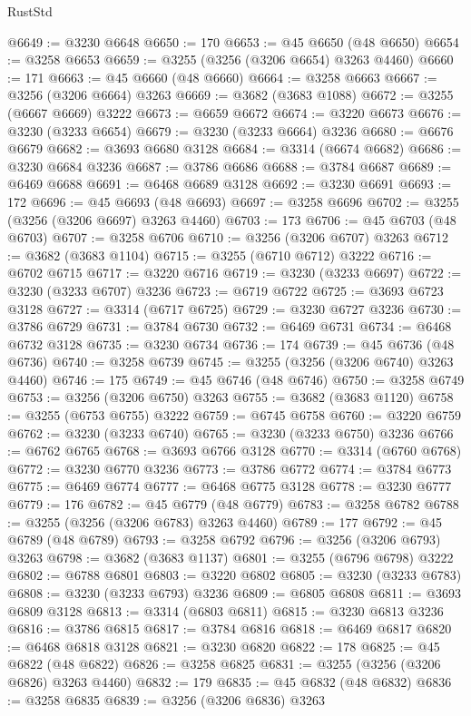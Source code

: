 \begin{lexlean}{RustStd}
\begin{coremodule}
{\begin{coremodule}
{{{{{{{{{{{{{{{{{{{{{{{{{{{{{{{{{{{{{@6649 := @3230 @6648
@6650 := 170
@6653 := @45 @6650 (@48 @6650)
@6654 := @3258 @6653
@6659 := @3255 (@3256 (@3206 @6654) @3263 @4460)
@6660 := 171
@6663 := @45 @6660 (@48 @6660)
@6664 := @3258 @6663
@6667 := @3256 (@3206 @6664) @3263
@6669 := @3682 (@3683 @1088)
@6672 := @3255 (@6667 @6669) @3222
@6673 := @6659 @6672
@6674 := @3220 @6673
@6676 := @3230 (@3233 @6654)
@6679 := @3230 (@3233 @6664) @3236
@6680 := @6676 @6679
@6682 := @3693 @6680 @3128
@6684 := @3314 (@6674 @6682)
@6686 := @3230 @6684 @3236
@6687 := @3786 @6686
@6688 := @3784 @6687
@6689 := @6469 @6688
@6691 := @6468 @6689 @3128
@6692 := @3230 @6691
@6693 := 172
@6696 := @45 @6693 (@48 @6693)
@6697 := @3258 @6696
@6702 := @3255 (@3256 (@3206 @6697) @3263 @4460)
@6703 := 173
@6706 := @45 @6703 (@48 @6703)
@6707 := @3258 @6706
@6710 := @3256 (@3206 @6707) @3263
@6712 := @3682 (@3683 @1104)
@6715 := @3255 (@6710 @6712) @3222
@6716 := @6702 @6715
@6717 := @3220 @6716
@6719 := @3230 (@3233 @6697)
@6722 := @3230 (@3233 @6707) @3236
@6723 := @6719 @6722
@6725 := @3693 @6723 @3128
@6727 := @3314 (@6717 @6725)
@6729 := @3230 @6727 @3236
@6730 := @3786 @6729
@6731 := @3784 @6730
@6732 := @6469 @6731
@6734 := @6468 @6732 @3128
@6735 := @3230 @6734
@6736 := 174
@6739 := @45 @6736 (@48 @6736)
@6740 := @3258 @6739
@6745 := @3255 (@3256 (@3206 @6740) @3263 @4460)
@6746 := 175
@6749 := @45 @6746 (@48 @6746)
@6750 := @3258 @6749
@6753 := @3256 (@3206 @6750) @3263
@6755 := @3682 (@3683 @1120)
@6758 := @3255 (@6753 @6755) @3222
@6759 := @6745 @6758
@6760 := @3220 @6759
@6762 := @3230 (@3233 @6740)
@6765 := @3230 (@3233 @6750) @3236
@6766 := @6762 @6765
@6768 := @3693 @6766 @3128
@6770 := @3314 (@6760 @6768)
@6772 := @3230 @6770 @3236
@6773 := @3786 @6772
@6774 := @3784 @6773
@6775 := @6469 @6774
@6777 := @6468 @6775 @3128
@6778 := @3230 @6777
@6779 := 176
@6782 := @45 @6779 (@48 @6779)
@6783 := @3258 @6782
@6788 := @3255 (@3256 (@3206 @6783) @3263 @4460)
@6789 := 177
@6792 := @45 @6789 (@48 @6789)
@6793 := @3258 @6792
@6796 := @3256 (@3206 @6793) @3263
@6798 := @3682 (@3683 @1137)
@6801 := @3255 (@6796 @6798) @3222
@6802 := @6788 @6801
@6803 := @3220 @6802
@6805 := @3230 (@3233 @6783)
@6808 := @3230 (@3233 @6793) @3236
@6809 := @6805 @6808
@6811 := @3693 @6809 @3128
@6813 := @3314 (@6803 @6811)
@6815 := @3230 @6813 @3236
@6816 := @3786 @6815
@6817 := @3784 @6816
@6818 := @6469 @6817
@6820 := @6468 @6818 @3128
@6821 := @3230 @6820
@6822 := 178
@6825 := @45 @6822 (@48 @6822)
@6826 := @3258 @6825
@6831 := @3255 (@3256 (@3206 @6826) @3263 @4460)
@6832 := 179
@6835 := @45 @6832 (@48 @6832)
@6836 := @3258 @6835
@6839 := @3256 (@3206 @6836) @3263
}}}}}}}}}}}}}}}}}}}}}}}}}}}}}}}}}}}}}
\end{coremodule}}
\end{coremodule}
\end{lexlean}
